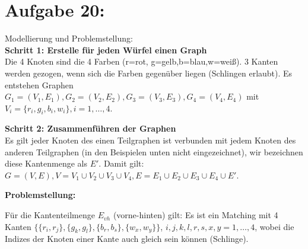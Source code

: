 \documentclass[11pt]{scrartcl} %
\newcommand{\addEdge}[1]{
    \foreach \start/\end/\style in {#1}
        \draw [\style] (\start) to (\end);
}
\begin{document}
\section*{Aufgabe 20:}
\begin{compactenum}[(a)]
\item Modellierung und Problemstellung:\\

\textbf{Schritt 1: Erstelle für jeden Würfel einen Graph}\\
Die 4 Knoten sind die 4 Farben (r=rot, g=gelb,b=blau,w=weiß). 3 Kanten werden gezogen, wenn sich die Farben gegenüber liegen (Schlingen erlaubt). Es entstehen Graphen $G_1=(V_1,E_1),G_2=(V_2,E_2),G_3=(V_3,E_3),G_4=(V_4,E_4)$ mit $V_i=\lbrace r_i,g_i,b_i,w_i \rbrace, i=1,\dots, 4$.
\newline

\textbf{Schritt 2: Zusammenführen der Graphen}  \\
Es gilt jeder Knoten des einen Teilgraphen ist verbunden mit jedem Knoten des anderen Teilgraphen (in den Beispielen unten nicht eingezeichnet), wir bezeichnen diese Kantenmenge als $E'$. Damit gilt: $G=(V,E), V=V_1 \cup V_2\cup V_3\cup V_4, E=E_1 \cup E_2 \cup E_3 \cup E_4 \cup E'$.

\newpage
\textbf{Problemstellung:} 

\begin{minipage}[h]{0.25\textwidth}
\end{minipage}
\begin{minipage}[h]{0.75\textwidth}
    Für die Kantenteilmenge $E_{vh}$ (vorne-hinten) gilt: Es ist ein Matching mit 4 Kanten $\lbrace \lbrace r_i,r_j \rbrace,\lbrace g_k,g_l\rbrace,\lbrace b_r,b_s \rbrace ,\lbrace w_x,w_y\rbrace \rbrace$, $i,j,k,l,r,s,x,y =1,\dots,4$, wobei die Indizes der Knoten einer Kante auch gleich sein können (Schlinge).
\end{minipage}


\end{compactenum}
\end{document}
